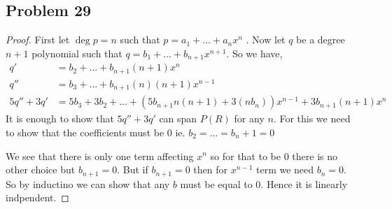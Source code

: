 \documentclass[a4paper]{report}
\begin{document}
\subsection*{Problem 29}


\begin{proof}
    First let $\deg p = n$ such that $p = a_1+\dots+a_nx^{n}$ . Now let $q $ be a degree $n + 1$ polynomial such that $q = b_1 + \dots + b_{n+1}x^{n+1} $. So we have, 
    \begin{align*}
        q' &= b_2 + \dots + b_{n+1}(n+1)x^{n}\\
        q'' &= b_3 + \dots + b_{n+1}(n)(n+1)x^{n -1}\\
        5q'' + 3q' &= 5b_3 + 3b_2 + \dots + (5b_{n+1}n(n+1) +3(nb_n))x^{n-1} + 3b_{n+1}(n+1)x^{n}
    \end{align*}
    It is enough to show that $5q'' + 3q'$ can span $P(R)$ for any $n$. For this we need to show that the coefficients must be 0 ie. $b_2=\dots=b_n+1 = 0$

    We see that there is only one term affecting $x^{n}$ so for that to be $0$ there is no other choice but $b_{n+1} = 0$. But if $b_{n+1} = 0$  then for $x^{n-1}$ term we  need $b_n = 0$. So by inductino we can show that any $b$ must be equal to 0. Hence it is linearly indpendent.
\end{proof}
\end{document}
